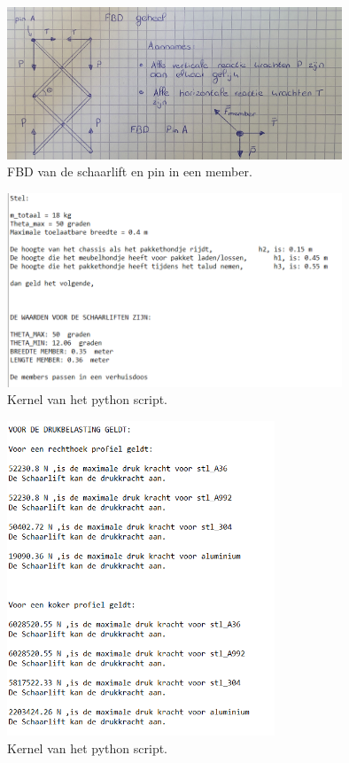 \begin{figure}[H]
    \includegraphics[width = 100mm]{04_conceptdimensionering/member_FBD.jpg}
    \caption{FBD van de schaarlift en pin in een member.}
    \label{fig: FBD_member}
\end{figure}
\vspace{\baselineskip}

\begin{figure}[H]
    \includegraphics[width = 100mm]{04_conceptdimensionering/Schaarlift_kernel_1.PNG}
    \caption{Kernel van het python script.}
    \label{fig: Kernel_schaarlift_1}
\end{figure}

\begin{figure}[H]
    \includegraphics[width = 80mm]{04_conceptdimensionering/Schaar.PNG}
    \caption{Kernel van het python script.}
    \label{fig: Kernel_schaarlift_2}
\end{figure}
\vspace{\baselineskip}

